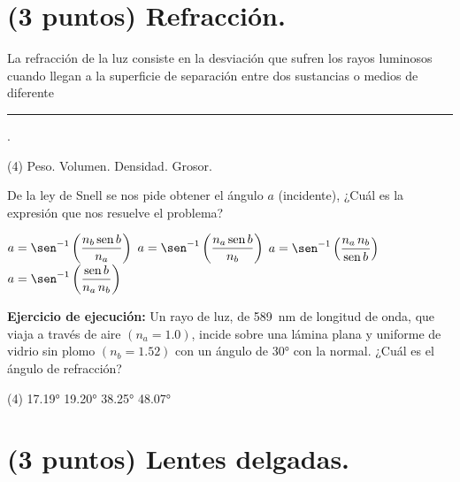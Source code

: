 \documentclass[12pt]{exam}
\begin{document}
\begin{questions}

    \section{(3 puntos) Refracción.}

    \question La refracción de la luz consiste en la desviación que sufren los rayos luminosos cuando llegan a la superficie de separación entre dos sustancias o medios de diferente \rule{2.5cm}{0.1mm}.
    \begin{tasks}(4)
        \task Peso.
        \task Volumen.
        \task Densidad.
        \task Grosor.
    \end{tasks}
    \question De la ley de Snell se nos pide obtener el ángulo $a$ (incidente), ¿Cuál es la expresión que nos resuelve el problema?
    \begin{multicols}{2}
    \begin{tasks}
        \task $ a = \sen^{-1} \left(\dfrac{n_{b} \, \text{sen} \, b}{n_{a}} \right)$
        \task $ a = \sen^{-1} \left(\dfrac{n_{a} \, \text{sen} \, b}{n_{b}} \right)$
        \task $ a = \sen^{-1} \left(\dfrac{n_{a} \, n_{b}}{\text{sen} \, b} \right)$
        \task $ a = \sen^{-1} \left(\dfrac{\text{sen} \, b}{n_{a} \, n_{b}} \right)$
    \end{tasks}
    \end{multicols}
    \question \label{Ejercicio_06} \textbf{Ejercicio de ejecución:} Un rayo de luz, de \SI{589}{\nano\meter} de longitud de onda, que viaja a través de aire $(n_{a} = 1.0)$, incide sobre una lámina plana y uniforme de vidrio sin plomo $(n_{b} = 1.52)$ con un ángulo de \ang{30} con la normal. ¿Cuál es el ángulo de refracción?
    \begin{tasks}(4)
        \task \ang{17.19}
        \task \ang{19.20}
        \task \ang{38.25}
        \task \ang{48.07}
    \end{tasks}

    \section{(3 puntos) Lentes delgadas.}


\end{questions}
\end{document}
